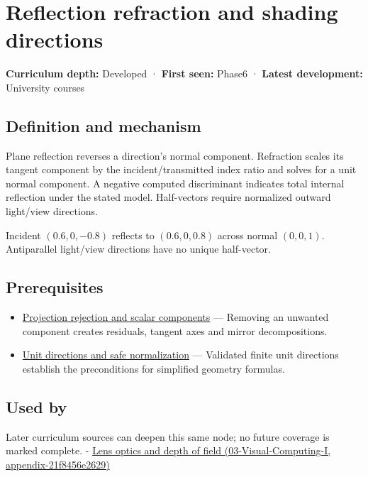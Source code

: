 \hypertarget{appendix-44e00863b4d5}{}
\section{Reflection refraction and shading directions}\label{appendix-44e00863b4d5-reflection-refraction-and-shading-directions}

\textbf{Curriculum depth:} Developed · \textbf{First seen:} Phase6 · \textbf{Latest development:} University courses

\subsection{Definition and mechanism}\label{appendix-44e00863b4d5-definition-and-mechanism}

Plane reflection reverses a direction's normal component. Refraction scales its tangent component by the incident/transmitted index ratio and solves for a unit normal component. A negative computed discriminant indicates total internal reflection under the stated model. Half-vectors require normalized outward light/view directions.

Incident \((0.6,0,-0.8)\) reflects to \((0.6,0,0.8)\) across normal \((0,0,1)\). Antiparallel light/view directions have no unique half-vector.

\subsection{Prerequisites}\label{appendix-44e00863b4d5-prerequisites}

\begin{itemize}
\tightlist
\item
  \hyperref[appendix-505a502c372a]{Projection rejection and scalar components} --- Removing an unwanted component creates residuals, tangent axes and mirror decompositions.
\item
  \hyperref[appendix-f744e41b95b4]{Unit directions and safe normalization} --- Validated finite unit directions establish the preconditions for simplified geometry formulas.
\end{itemize}

\subsection{Used by}\label{appendix-44e00863b4d5-used-by}

Later curriculum sources can deepen this same node; no future coverage is marked complete. - \href{../03-Visual-Computing-I/main.pdf\#nameddest=appendix-21f8456e2629}{Lens optics and depth of field (03-Visual-Computing-I, appendix-21f8456e2629)}

